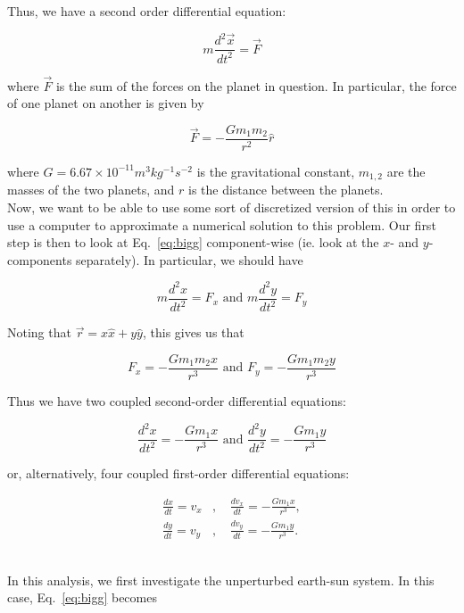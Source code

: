 \documentclass[12pt]{article}
\numberwithin{equation}{section}
\begin{document}
\noindent Thus, we have a second order differential equation:

$$m\frac{d^{2}\vec{x}}{dt^{2}} = \vec{F}$$

\noindent where $\vec{F}$ is the sum of the forces on the planet in question.  In particular, the force of one planet on another is given by

\begin{equation}
\label{eq:bigg}
\vec{F} = -\frac{Gm_{1}m_{2}}{r^{2}}\hat{r}
\end{equation}

\noindent where $G = 6.67\times10^{-11} m^{3}kg^{-1}s^{-2}$ is the gravitational constant, $m_{1,2}$ are the masses of the two planets, and $r$ is the distance between the planets.
\\\indent Now, we want to be able to use some sort of discretized version of this in order to use a computer to approximate a numerical solution to this problem.  Our first step is then to look at Eq.~\ref{eq:bigg} component-wise (ie. look at the $x$- and $y$- components separately).  In particular, we should have

$$
m\frac{d^{2}x}{dt^{2}} = F_{x} \text{ and } m\frac{d^{2}y}{dt^{2}} = F_{y}
$$

\noindent Noting that $\vec{r}=x\hat{x}+y\hat{y}$, this gives us that

$$
F_{x} = -\frac{Gm_{1}m_{2}x}{r^{3}}\text{ and } F_{y} = -\frac{Gm_{1}m_{2}y}{r^{3}}
$$

\noindent Thus we have two coupled second-order differential equations:

\begin{equation}
\label{eq:diffeqs1}
\frac{d^{2}x}{dt^{2}} = -\frac{Gm_{1}x}{r^{3}}\text{ and } \frac{d^{2}y}{dt^{2}} = -\frac{Gm_{1}y}{r^{3}}
\end{equation}

\noindent or, alternatively, four coupled first-order differential equations:

\begin{equation}
\label{eq:diffeqs2}
\begin{align}
\frac{dx}{dt} = v_{x} &\text{, }&\frac{dv_{x}}{dt}=-\frac{Gm_{1}x}{r^{3}}, \\
\frac{dy}{dt} = v_{y} &\text{, }&\frac{dv_{y}}{dt}=-\frac{Gm_{1}y}{r^{3}}.
\end{align}
\end{equation}

\\\indent In this analysis, we first investigate the unperturbed earth-sun system.  In this case, Eq.~\ref{eq:bigg} becomes
\end{document}
